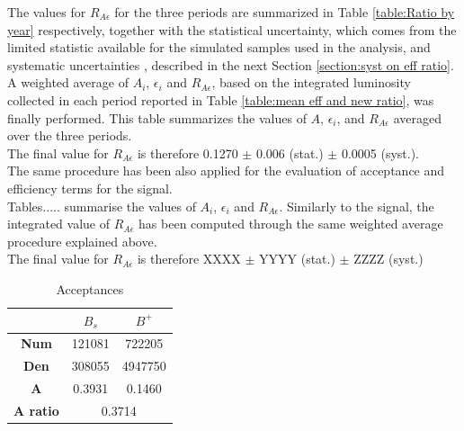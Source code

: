 \noindent
The values for  $R_{A\epsilon}$ for the three periods are summarized in Table \ref{table:Ratio by year} respectively, together with the statistical uncertainty, which comes from the limited statistic available for the simulated samples used in the analysis, and systematic uncertainties , described in the next Section \ref{section:syst on eff ratio}. \\

\noindent
A weighted average of $A_i$, $\epsilon_i$ and $R_{A\epsilon}$, based on the integrated luminosity collected in each period reported in Table \ref{table:mean eff and new ratio}, was finally performed. 
This table summarizes the values of $A$, $\epsilon_i$, and $R_{A\epsilon}$ averaged over the three periods.\\
The final value for $R_{A\epsilon}$ is therefore 0.1270 $\pm$ 0.006 (stat.) $\pm$ 0.0005 (syst.). \\

\noindent
The same procedure has been also applied for the evaluation of acceptance and efficiency terms for the \Bdmumu signal. \\
Tables..... summarise the values of $A_i$, $\epsilon_i$ and $R_{A\epsilon}$. Similarly to the \Bsmumu signal, the integrated value of $R_{A\epsilon}$ has been computed  through the same weighted average procedure explained above. \\
The final value for $R_{A\epsilon}$ is therefore XXXX $\pm$ YYYY (stat.) $\pm$ ZZZZ (syst.)

\begin{table}[h]
\centering
\begin{tabular}{|c|cc|}
\hline
                 & \multicolumn{1}{c|}{$B_s$}  & $B^+$                       \\ \hline
\textbf{Num}     & \multicolumn{1}{c|}{121081} & 722205                      \\ \hline
\textbf{Den}     & \multicolumn{1}{c|}{308055} & 4947750                     \\ \hline
\textbf{A}       & \multicolumn{1}{c|}{0.3931} & \multicolumn{1}{c|}{0.1460} \\ \hline
\textbf{A ratio} & \multicolumn{2}{c|}{0.3714}                               \\ \hline
\end{tabular}
\caption{Acceptances}
\label{table::acceptances}
\end{table}


